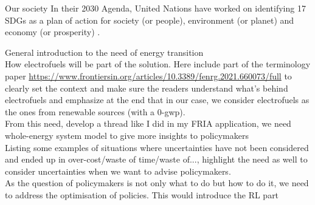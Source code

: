 
Our society In their 2030 Agenda, United Nations have worked on identifying 17 \gls{SDGs} as a plan of action for society (or people), environment (or planet) and economy (or prosperity) \cite{un_sdgs}. 
%
%

General introduction to the need of energy transition\\

How electrofuels will be part of the solution. Here include part of the terminology paper \url{https://www.frontiersin.org/articles/10.3389/fenrg.2021.660073/full} to clearly set the context and make sure the readers understand what's behind electrofuels and emphasize at the end that in our case, we consider electrofuels as the ones from renewable sources (with a 0-gwp).\\

From this need, develop a thread like I did in my FRIA application, we need whole-energy system model to give more insights to policymakers\\

Listing some examples of situations where uncertainties have not been considered and ended up in over-cost/waste of time/waste of..., highlight the need as well to consider uncertainties when we want to advise policymakers.\\

As the question of policymakers is not only what to do but how to do it, we need to address the optimisation of policies. This would introduce the RL part





